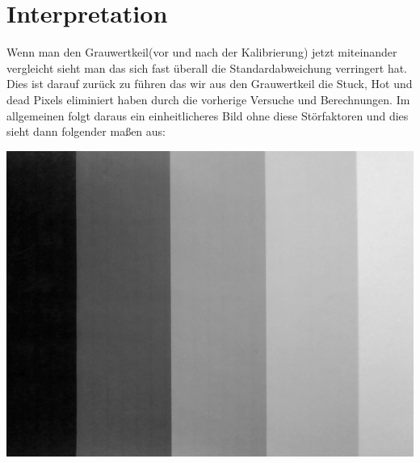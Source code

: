 \section{Interpretation}
\label{chap:VERSUCH_4_INTERPRETATION}
Wenn man den Grauwertkeil(vor und nach der Kalibrierung) jetzt miteinander vergleicht sieht man das sich fast überall die Standardabweichung verringert hat. Dies ist darauf zurück zu führen das wir aus den Grauwertkeil die Stuck, Hot und dead Pixels eliminiert haben durch die vorherige Versuche und Berechnungen.
Im allgemeinen folgt daraus ein einheitlicheres Bild ohne diese Störfaktoren und dies sieht dann folgender maßen aus:

\includegraphics[scale=0.65]{media/grauWertKorrektur}